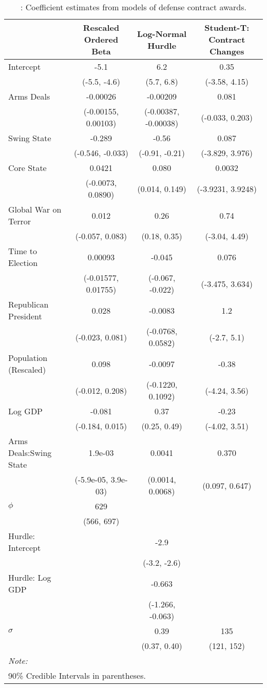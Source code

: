 \begingroup\fontsize{8}{10}\selectfont

\begin{longtable}[t]{lccc}
\caption{\label{tab:cont-regs}: Coefficient estimates from models of defense contract awards.}\\
\toprule
  & Rescaled Ordered Beta & Log-Normal Hurdle & Student-T: Contract Changes\\
\midrule
Intercept & -5.1 & 6.2 & 0.35\\
 & (-5.5, -4.6) & (5.7, 6.8) & (-3.58, 4.15)\\
Arms Deals & -0.00026 & -0.00209 & 0.081\\
 & (-0.00155, 0.00103) & (-0.00387, -0.00038) & (-0.033, 0.203)\\
Swing State & -0.289 & -0.56 & 0.087\\
 & (-0.546, -0.033) & (-0.91, -0.21) & (-3.829, 3.976)\\
Core State & 0.0421 & 0.080 & 0.0032\\
 & (-0.0073, 0.0890) & (0.014, 0.149) & (-3.9231, 3.9248)\\
Global War on Terror & 0.012 & 0.26 & 0.74\\
 & (-0.057, 0.083) & (0.18, 0.35) & (-3.04, 4.49)\\
Time to Election & 0.00093 & -0.045 & 0.076\\
 & (-0.01577, 0.01755) & (-0.067, -0.022) & (-3.475, 3.634)\\
Republican President & 0.028 & -0.0083 & 1.2\\
 & (-0.023, 0.081) & (-0.0768, 0.0582) & (-2.7, 5.1)\\
Population (Rescaled) & 0.098 & -0.0097 & -0.38\\
 & (-0.012, 0.208) & (-0.1220, 0.1092) & (-4.24, 3.56)\\
Log GDP & -0.081 & 0.37 & -0.23\\
 & (-0.184, 0.015) & (0.25, 0.49) & (-4.02, 3.51)\\
Arms Deals:Swing State & 1.9e-03 & 0.0041 & 0.370\\
 & (-5.9e-05, 3.9e-03) & (0.0014, 0.0068) & (0.097, 0.647)\\
$\phi$ & 629 &  & \\
 & (566, 697) &  & \\
Hurdle: Intercept &  & -2.9 & \\
 &  & (-3.2, -2.6) & \\
Hurdle: Log GDP &  & -0.663 & \\
 &  & (-1.266, -0.063) & \\
$\sigma$ &  & 0.39 & 135\\
 &  & (0.37, 0.40) & (121, 152)\\
\bottomrule
\multicolumn{4}{l}{\rule{0pt}{1em}\textit{Note: }}\\
\multicolumn{4}{l}{\rule{0pt}{1em}90\% Credible Intervals in parentheses.}\\
\end{longtable}
\endgroup{}
